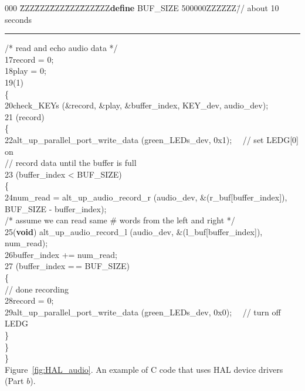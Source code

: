 \documentclass[11pt, twoside, pdftex]{article}
\begin{document}
\begin{table}
\begin{center}
\begin{minipage}[t]{12.5 cm}
\begin{tabbing}
000 \=ZZZ\=ZZZ\=ZZZ\=ZZZ\=ZZZ\=ZZZ\={\bf define} BUF\_SIZE 500000ZZZZZZ\=// about 10 seconds \kill
\rule{6.0in}{0in} 
\>\>/* read and echo audio data */\\
17\>\>record = 0;\\
18\>\>play = 0;\\
19\>(1)\\
\>\>\{\\
20\>\>\>check\_KEYs (\&record, \&play, \&buffer\_index, KEY\_dev, audio\_dev);\\
21\>\> (record)\\
\>\>\>\{\\
22\>\>\>\>alt\_up\_parallel\_port\_write\_data (green\_LEDs\_dev, 0x1); ~~// set LEDG[0] on\\
 
\>\>\>\>// record data until the buffer is full\\
23\>\>\> (buffer\_index < BUF\_SIZE)\\
\>\>\>\>\{\\
24\>\>\>\>\>num\_read = alt\_up\_audio\_record\_r (audio\_dev, \&(r\_buf[buffer\_index]), \\
\>\>\>\>\>\>BUF\_SIZE - buffer\_index);\\
\>\>\>\>\>/* assume we can read same \# words from the left and right */\\
25\>\>\>\>\>({\bf void}) alt\_up\_audio\_record\_l (audio\_dev, \&(l\_buf[buffer\_index]), num\_read);\\
26\>\>\>\>\>buffer\_index += num\_read;\\
 
27\>\>\>\> (buffer\_index =$\,$= BUF\_SIZE)\\
\>\>\>\>\>\{\\
\>\>\>\>\>\>// done recording\\
28\>\>\>\>\>\>record = 0;\\
29\>\>\>\>\>\>alt\_up\_parallel\_port\_write\_data (green\_LEDs\_dev, 0x0); ~~// turn off LEDG\\
\>\>\>\>\>\}\\
\>\>\>\>\}\\
\>\>\>\}\\
 
\>\>\>\>Figure~\ref{fig:HAL_audio}. An example of C code that uses HAL device drivers (Part $b$).
\end{tabbing}
\end{minipage}
\end{center}
\end{table}
\end{document}
